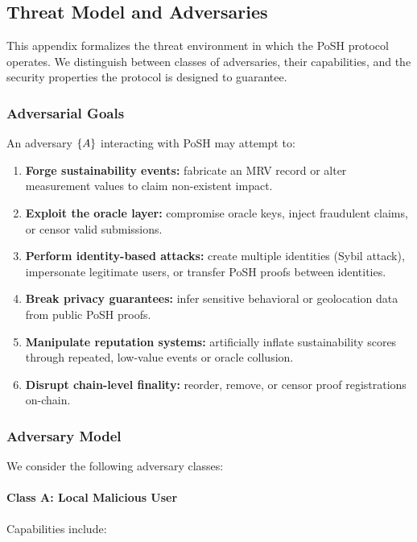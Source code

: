 \documentclass{article}
\begin{document}
\subsection{Threat Model and Adversaries}

This appendix formalizes the threat environment in which the PoSH protocol
operates. We distinguish between classes of adversaries, their capabilities,
and the security properties the protocol is designed to guarantee.

\subsubsection{Adversarial Goals}

An adversary $\mathcal\{A\}$ interacting with PoSH may attempt to:

\begin{enumerate}
\item \textbf{Forge sustainability events:} fabricate an MRV record or alter
measurement values to claim non-existent impact.
\item \textbf{Exploit the oracle layer:} compromise oracle keys, inject
fraudulent claims, or censor valid submissions.
\item \textbf{Perform identity-based attacks:} create multiple identities
(Sybil attack), impersonate legitimate users, or transfer PoSH proofs
between identities.
\item \textbf{Break privacy guarantees:} infer sensitive behavioral or
geolocation data from public PoSH proofs.
\item \textbf{Manipulate reputation systems:} artificially inflate sustainability
scores through repeated, low-value events or oracle collusion.
\item \textbf{Disrupt chain-level finality:} reorder, remove, or censor proof
registrations on-chain.
\end{enumerate}

\subsubsection{Adversary Model}

We consider the following adversary classes:

\paragraph{Class A: Local Malicious User}

Capabilities include:
\end{document}
